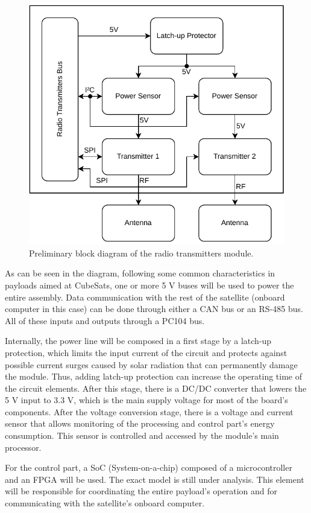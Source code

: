 \begin{figure}[!ht]
    \begin{center}
        \includegraphics[width=0.6\columnwidth]{figures/radios-block-diagram}
        \caption{Preliminary block diagram of the radio transmitters module.}
        \label{fig:payload-block-diagram-radios}
    \end{center}
\end{figure}

As can be seen in the diagram, following some common characteristics in payloads aimed at CubeSats, one or more 5 V buses will be used to power the entire assembly. Data communication with the rest of the satellite (onboard computer in this case) can be done through either a CAN bus or an RS-485 bus. All of these inputs and outputs through a PC104 bus.

Internally, the power line will be composed in a first stage by a latch-up protection, which limits the input current of the circuit and protects against possible current surges caused by solar radiation that can permanently damage the module. Thus, adding latch-up protection can increase the operating time of the circuit elements. After this stage, there is a DC/DC converter that lowers the 5 V input to 3.3 V, which is the main supply voltage for most of the board's components. After the voltage conversion stage, there is a voltage and current sensor that allows monitoring of the processing and control part's energy consumption. This sensor is controlled and accessed by the module's main processor.

For the control part, a SoC (System-on-a-chip) composed of a microcontroller and an FPGA will be used. The exact model is still under analysis. This element will be responsible for coordinating the entire payload's operation and for communicating with the satellite's onboard computer.

